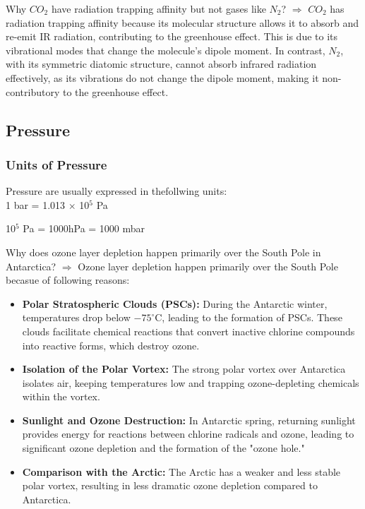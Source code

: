 \documentclass[fleqn,10pt]{SelfArx} %
\begin{document}
 \begin{question}[label={q:4.2}]{Why $CO_2$ have radiation trapping affinity but not gases like $N_2$?}
    $\Rightarrow$ $CO_2$ has radiation trapping affinity because its molecular structure allows it to absorb and re-emit IR radiation, contributing to the greenhouse effect. This is due to its vibrational modes that change the molecule's dipole moment. In contrast, $N_2$, with its symmetric diatomic structure, cannot absorb infrared radiation effectively, as its vibrations do not change the dipole moment, making it non-contributory to the greenhouse effect.
\end{question}

\subsection{Pressure}
\subsubsection*{Units of Pressure}

Pressure are usually expressed in thefollwing units: \\

1 bar = 1.013 $\times$ 10$^5$ Pa 

10$^5$ Pa = 1000hPa = 1000 mbar

\begin{question}[label={q:4.3}]{Why does ozone layer depletion happen primarily over the South Pole in Antarctica?}
   $\Rightarrow$ Ozone layer depletion happen primarily over the South Pole becasue of following reasons: 
   \begin{itemize}
        \item \textbf{Polar Stratospheric Clouds (PSCs):} During the Antarctic winter, temperatures drop below $-75^\circ$C, leading to the formation of PSCs. These clouds facilitate chemical reactions that convert inactive chlorine compounds into reactive forms, which destroy ozone.

        \item \textbf{Isolation of the Polar Vortex:} The strong polar vortex over Antarctica isolates air, keeping temperatures low and trapping ozone-depleting chemicals within the vortex.

        \item \textbf{Sunlight and Ozone Destruction:} In Antarctic spring, returning sunlight provides energy for reactions between chlorine radicals and ozone, leading to significant ozone depletion and the formation of the "ozone hole."

        \item \textbf{Comparison with the Arctic:} The Arctic has a weaker and less stable polar vortex, resulting in less dramatic ozone depletion compared to Antarctica.
   \end{itemize}
\end{question}
\end{document}
